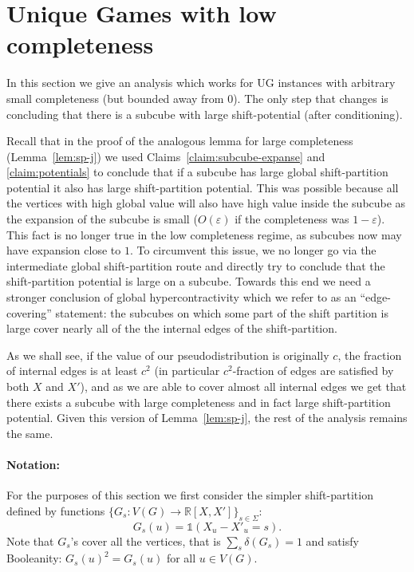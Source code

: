 \documentclass[11pt]{article}
\def \R {\mathbb{R}}
\def \eps {{\varepsilon}}
\def \one {\mathbb{1}}
\theoremstyle{definition}
\begin{document}
\section{Unique Games with low completeness}\label{sec:johnson_2}
In this section we give an analysis which works for UG instances with arbitrary small completeness (but bounded away from $0$). The only step that changes is concluding that there is a subcube with large shift-potential (after conditioning). 

Recall that in the proof of the analogous lemma for large completeness (Lemma~\ref{lem:sp-j}) 
we used Claims~\ref{claim:subcube-expanse} and \ref{claim:potentials} to conclude that if a subcube has large global shift-partition potential it also has large shift-partition potential. This was possible 
because all the vertices with high global value will also have high value inside the subcube as the expansion of the subcube is small ($O(\eps)$ if the completeness was $1-\eps$). This fact is no longer true in the low completeness regime, as subcubes 
now may have expansion close to $1$.
To circumvent this issue, we no longer go via the intermediate global shift-partition route and 
directly try to conclude that the shift-partition potential is large on a subcube. Towards this end 
we need a stronger conclusion of global hypercontractivity which we refer to 
as an ``edge-covering'' statement: the subcubes on which some part of the shift partition is large cover nearly all of the the internal edges of the shift-partition. 

As we shall see, if the value of our pseudodistribution is originally $c$, the 
fraction of internal edges is at least $c^2$ (in particular $c^2$-fraction of edges are satisfied by both $X$ and $X'$), and as we are able to cover almost all internal edges we get that there exists a subcube with large completeness and in fact large shift-partition potential. Given this version of Lemma~\ref{lem:sp-j}, the rest of the analysis remains the same. 

\paragraph{Notation:}
For the purposes of this section we first consider the simpler shift-partition defined by functions $\{G_s: V(G) \rightarrow \R[X,X']\}_{s \in \Sigma}$:
\[G_s(u) = \one(X_u - X'_u = s).\]
Note that $G_s$'s cover all the vertices, that is $\sum_s \delta(G_s) = 1$ and satisfy Booleanity: $G_s(u)^2 = G_s(u)$ for all $u \in V(G)$.
\end{document}
